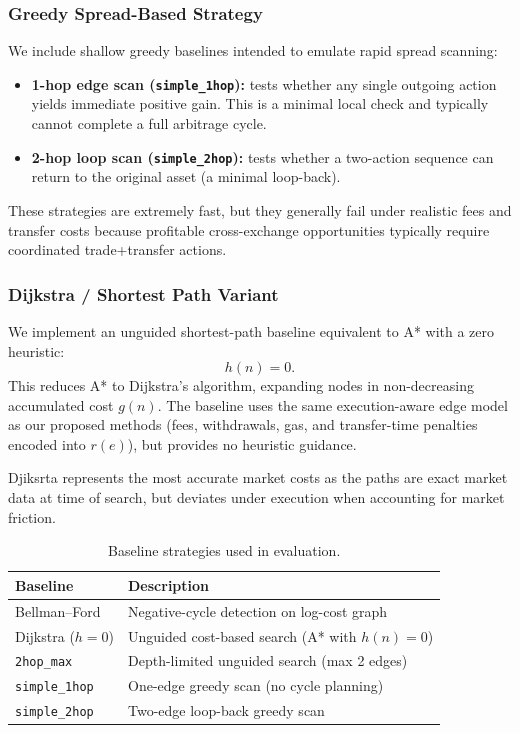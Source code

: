 \subsubsection{Greedy Spread-Based Strategy}
\label{sec:greedy-baseline}

We include shallow greedy baselines intended to emulate rapid spread scanning:

\begin{itemize}
    \item \textbf{1-hop edge scan (\texttt{simple\_1hop}):} tests whether any single outgoing action yields immediate positive gain. This is a minimal local check and typically cannot complete a full arbitrage cycle.
    \item \textbf{2-hop loop scan (\texttt{simple\_2hop}):} tests whether a two-action sequence can return to the original asset (a minimal loop-back).
\end{itemize}

These strategies are extremely fast, but they generally fail under realistic fees and transfer costs because profitable cross-exchange opportunities typically require coordinated trade+transfer actions.

\subsubsection{Dijkstra / Shortest Path Variant}
\label{sec:dijkstra-baseline}

We implement an unguided shortest-path baseline equivalent to A* with a zero heuristic:
\[
h(n) = 0.
\] %
This reduces A* to Dijkstra’s algorithm, expanding nodes in non-decreasing accumulated cost $g(n)$. The baseline uses the same execution-aware edge model as our proposed methods (fees, withdrawals, gas, and transfer-time penalties encoded into $r(e)$), but provides no heuristic guidance.

Djiksrta represents the most accurate market costs as the paths are exact market data at time of search, but deviates under execution when accounting for market friction.

\begin{table}[t]
\centering
\small
\setlength{\tabcolsep}{4pt}
\caption{Baseline strategies used in evaluation.}
\label{tab:baseline-summary}
\begin{tabular}{ll}
\toprule
\textbf{Baseline} & \textbf{Description} \\
\midrule
Bellman--Ford & Negative-cycle detection on log-cost graph \\
Dijkstra ($h{=}0$) & Unguided cost-based search (A* with $h(n)=0$) \\
\texttt{2hop\_max} & Depth-limited unguided search (max 2 edges) \\
\texttt{simple\_1hop} & One-edge greedy scan (no cycle planning) \\
\texttt{simple\_2hop} & Two-edge loop-back greedy scan \\
\bottomrule
\end{tabular}
\end{table}


